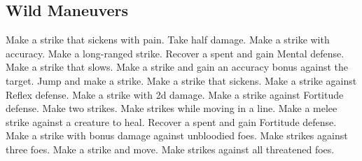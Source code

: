 \small
\subsection{Wild Maneuvers}\label{Wild Maneuvers}
\begin{spelllist}
 Make a strike that sickens with pain.
 Take half damage.
 Make a strike with  accuracy.
 Make a long-ranged strike.
 Recover a spent  and gain  Mental defense.
 Make a strike that slows.
 Make a strike and gain an accuracy bonus against the target.
 Jump and make a strike.
 Make a strike that sickens.
 Make a strike against Reflex defense.
 Make a strike with \plus2d damage.
 Make a strike against Fortitude defense.
 Make two strikes.
 Make strikes while moving in a line.
 Make a melee strike against a creature to heal.
 Recover a spent  and gain  Fortitude defense.
 Make a strike with bonus damage against unbloodied foes.
 Make strikes against three foes.
 Make a strike and move.
 Make strikes against all threatened foes.
\end{spelllist}
